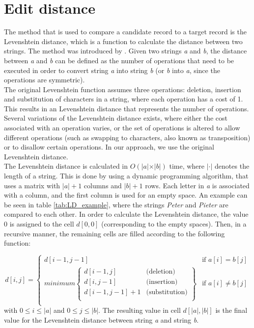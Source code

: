 \chapter{Edit distance}
The method that is used to compare a candidate record to a target record is the Levenshtein distance, which is a function to calculate the distance between two strings. The method was introduced by \cite{levenshtein1966binary}. Given two strings \textit{a} and \textit{b}, the distance between \textit{a} and \textit{b} can be defined as the number of operations that need to be executed in order to convert string \textit{a} into string \textit{b} (or \textit{b} into \textit{a}, since the operations are symmetric). \\
The original Levenshtein function assumes three operations: deletion, insertion and substitution of characters in a string, where each operation has a cost of 1. This results in an Levenshtein distance that represents the number of operations. Several variations of the Levenshtein distance exists, where either the cost associated with an operation varies, or the set of operations is altered to allow different operations (such as swapping to characters, also known as transposition) or to disallow certain operations. In our approach, we use the original Levenshtein distance. \\

The Levenshtein distance is calculated in $O(\vert a \vert \times \vert b \vert)$ time, where $\vert \cdot \vert$ denotes the length of a string. This is done by using a dynamic programming algorithm, that uses a matrix with $\vert a \vert + 1$ columns and $\vert b \vert + 1$ rows. Each letter in \textit{a} is associated with a column, and the first column is used for an empty space. An example can be seen in table \ref{tab:LD_example}, where the strings \textit{Peter} and \textit{Pieter} are compared to each other. In order to calculate the Levenshtein distance, the value 0 is assigned to the cell $d[0,0]$ (corresponding to the empty spaces). Then, in a recursive manner, the remaining cells are filled according to the following function:

\begin{equation}
	d[i,j] =
		\begin{cases}
			d[i-1, j-1] & \text{if }a[i] = b[j]\\
			minimum \left\{ 
				\begin{array}{lr}
					d[i-1, j] & \text{(deletion)} \\
					d[i, j-1] & \text{(insertion)}\\
					d[i-1, j-1] + 1 & \text{(substitution)}\\
			\end{array} 
				\right \} & \text{if } a[i] \not = b[j]\\
	\end{cases}
\end{equation} with $0 \leq i \leq \vert a \vert$ and $0 \leq j \leq \vert b \vert$. The resulting value in cell $d[\vert a \vert, \vert b \vert]$ is the final value for the Levenshtein distance between string \textit{a} and string \textit{b}.

